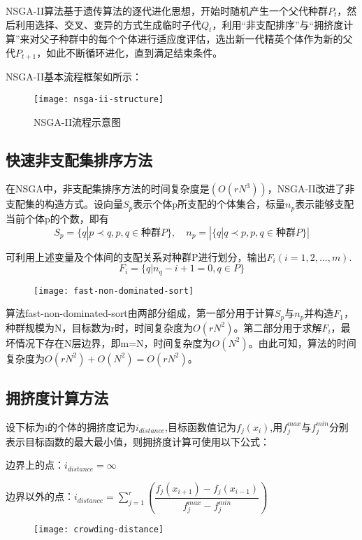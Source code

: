\documentclass[lang=cn,a4paper,citestyle=gb7714-2015, bibstyle=gb7714-2015]{elegantpaper}
\begin{document}
    NSGA-II算法基于遗传算法的逐代进化思想，开始时随机产生一个父代种群$P_t$，然后利用选择、交叉、变异的方式生成临时子代$Q_t$，利用“非支配排序”与“拥挤度计算”来对父子种群中的每个个体进行适应度评估，选出新一代精英个体作为新的父代$P_{t+1}$，如此不断循环进化，直到满足结束条件。

    NSGA-II基本流程框架如所示：
    \begin{figure}[!h]
        \centering
        \texttt{[image: nsga-ii-structure]}
        \caption{NSGA-II流程示意图}
        \label{fig:nsga-ii-structure}
    \end{figure}

    \subsection{快速非支配集排序方法}
    在NSGA中，非支配集排序方法的时间复杂度是$(O(rN^3))$，NSGA-II改进了非支配集的构造方式。设向量$S_p$表示个体p所支配的个体集合，标量$n_p$表示能够支配当前个体p的个数，即有
    $$S_p=\{q|p\prec q,p,q\in \text{种群}P\},\quad n_p=|\{q|q\prec p,p,q\in \text{种群}P\}|$$

    可利用上述变量及个体间的支配关系对种群P进行划分，输出$F_i(i=1,2,...,m)$.
    $$F_i=\{q|n_q-i+1=0,q \in P\}$$

    \begin{figure}[!h]
        \centering
        \texttt{[image: fast-non-dominated-sort]}
    \end{figure}

    算法fast-non-dominated-sort由两部分组成，第一部分用于计算$S_p$与$n_p$并构造$F_1$，种群规模为N，目标数为r时，时间复杂度为$O(rN^2)$。第二部分用于求解$F_i$，最坏情况下存在N层边界，即m=N，时间复杂度为$O(N^2)$。由此可知，算法的时间复杂度为$O(rN^2)+O(N^2)=O(rN^2)$。

    \subsection{拥挤度计算方法}
    设下标为i的个体的拥挤度记为$i_{distance}$,目标函数值记为$f_j(x_i)$,用$f_j^{max}$与$f_j^{min}$分别表示目标函数的最大最小值，则拥挤度计算可使用以下公式：

    边界上的点：$i_{distance}=\infty$

    边界以外的点：$i_{distance}= \sum\limits_{j=1}^r(\dfrac{f_j(x_{i+1}) - f_j(x_{i-1})}{f_j^{max} - f_j^{min}})$

    \begin{figure}[!h]
        \centering
        \texttt{[image: crowding-distance]}
    \end{figure}
\end{document}
